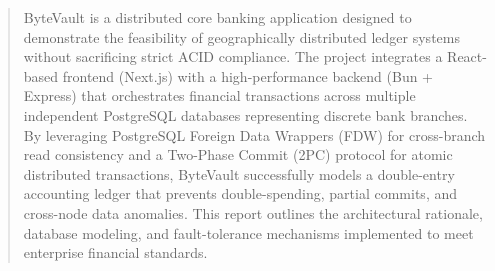 \begin{abstract}
ByteVault is a distributed core banking application designed to demonstrate the feasibility of geographically distributed ledger systems without sacrificing strict ACID compliance. The project integrates a React-based frontend (Next.js) with a high-performance backend (Bun + Express) that orchestrates financial transactions across multiple independent PostgreSQL databases representing discrete bank branches. By leveraging PostgreSQL Foreign Data Wrappers (FDW) for cross-branch read consistency and a Two-Phase Commit (2PC) protocol for atomic distributed transactions, ByteVault successfully models a double-entry accounting ledger that prevents double-spending, partial commits, and cross-node data anomalies. This report outlines the architectural rationale, database modeling, and fault-tolerance mechanisms implemented to meet enterprise financial standards.
\end{abstract}
